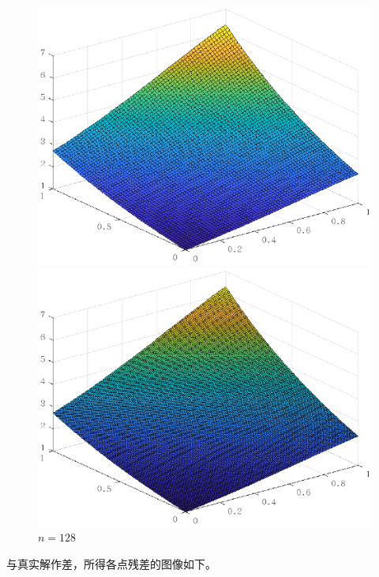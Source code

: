 \documentclass[lang=cn,11pt,a4paper]{elegantpaper}
\begin{document}
\begin{figure}[htbp]
\begin{minipage}[t]{0.24\linewidth}
    \includegraphics[width=0.95\linewidth]{figure/result_problem1_D_r_n=64.eps}
    \caption*{$n=64$}
  \end{minipage}
  \begin{minipage}[t]{0.24\linewidth}
    \centering
    \includegraphics[width=0.95\linewidth]{figure/result_problem1_D_r_n=128.eps}
    \caption*{$n=128$}
  \end{minipage}
\end{figure}

与真实解作差，所得各点残差的图像如下。
\end{document}

